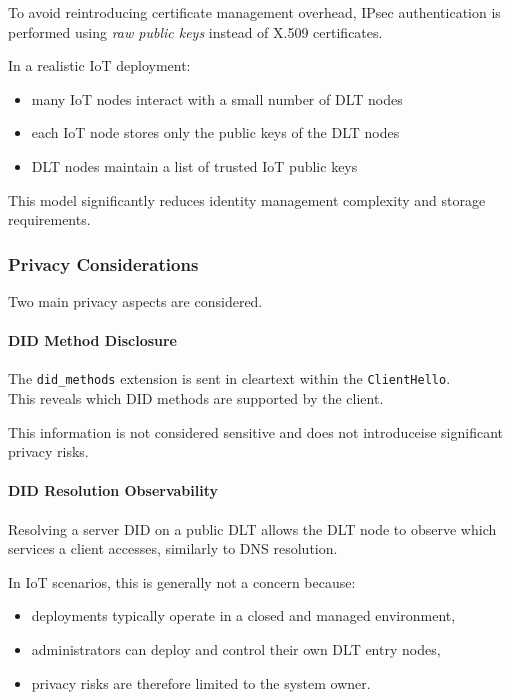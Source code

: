 \noindent
To avoid reintroducing certificate management overhead, IPsec authentication is performed using \emph{raw public keys} instead of X.509 certificates.
\medskip

\noindent
In a realistic IoT deployment:
\begin{itemize}
    \item many IoT nodes interact with a small number of DLT nodes
    \item each IoT node stores only the public keys of the DLT nodes
    \item DLT nodes maintain a list of trusted IoT public keys
\end{itemize}

\noindent
This model significantly reduces identity management complexity and storage requirements.

\subsubsection*{Privacy Considerations}

\noindent
Two main privacy aspects are considered.

\paragraph{DID Method Disclosure}
\noindent
The \texttt{did\_methods} extension is sent in cleartext within the \texttt{ClientHello}.\\  
This reveals which DID methods are supported by the client.
\smallskip

\noindent
This information is not considered sensitive and does not introduceise significant privacy risks.

\paragraph{DID Resolution Observability}
\noindent
Resolving a server DID on a public DLT allows the DLT node to observe which services a client accesses, similarly to DNS resolution.

\noindent
In IoT scenarios, this is generally not a concern because:
\begin{itemize}
    \item deployments typically operate in a closed and managed environment,
    \item administrators can deploy and control their own DLT entry nodes,
    \item privacy risks are therefore limited to the system owner.
\end{itemize}

